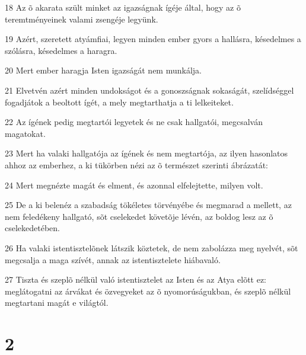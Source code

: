 \par 18 Az õ akarata szült minket az igazságnak ígéje által, hogy az õ teremtményeinek valami zsengéje legyünk.
\par 19 Azért, szeretett atyámfiai, legyen minden ember gyors a hallásra, késedelmes a szólásra, késedelmes a haragra.
\par 20 Mert ember haragja Isten igazságát nem munkálja.
\par 21 Elvetvén azért minden undokságot és a gonoszságnak sokaságát, szelídséggel fogadjátok a beoltott ígét, a mely  megtarthatja a ti lelkeiteket.
\par 22 Az ígének pedig megtartói legyetek és ne csak hallgatói, megcsalván magatokat.
\par 23 Mert ha valaki hallgatója az ígének és nem megtartója, az ilyen hasonlatos ahhoz az emberhez, a ki tükörben nézi az õ természet szerinti ábrázatát:
\par 24 Mert megnézte magát és elment, és azonnal elfelejtette, milyen volt.
\par 25 De a ki belenéz a szabadság tökéletes törvényébe és megmarad a mellett, az nem feledékeny hallgató, sõt cselekedet követõje lévén, az  boldog lesz az õ cselekedetében.
\par 26 Ha valaki istentisztelõnek látszik köztetek, de nem zabolázza meg nyelvét, sõt megcsalja a maga szívét, annak az istentisztelete hiábavaló.
\par 27 Tiszta és szeplõ nélkül való istentisztelet az Isten és az Atya elõtt ez: meglátogatni az árvákat és özvegyeket az õ nyomorúságukban, és szeplõ nélkül megtartani magát e világtól.

\chapter{2}

